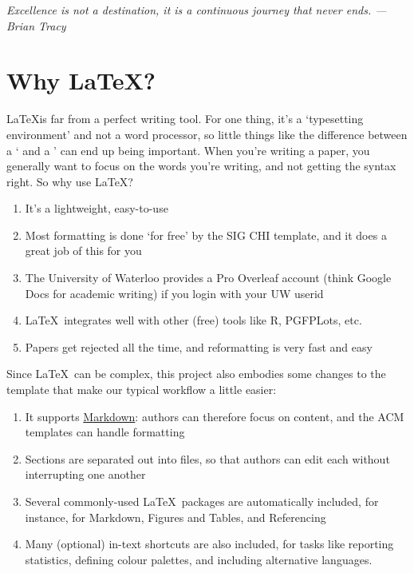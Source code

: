 
\vspace{2em}
\begin{center}
    \emph{Excellence is not a destination, it is a continuous journey that never ends.  --- Brian Tracy}
\end{center}

\section{Why \LaTeX?}

\LaTeX is far from a perfect writing tool. For one thing, it's a `typesetting environment' and not a word processor, so little things like the difference between a ` and a ' can end up being important. When you're writing a paper, you generally want to focus on the words you're writing, and not getting the syntax right. So why use \LaTeX?

\begin{enumerate}
    \item It's a lightweight, easy-to-use
    \item Most formatting is done `for free' by the SIG CHI template, and it does a great job of this for you
    \item The University of Waterloo provides a Pro Overleaf account (think Google Docs for academic writing) if you login with your UW userid
    \item \LaTeX\ integrates well with other (free) tools like R, PGFPLots, etc. 
    \item Papers get rejected all the time, and reformatting is very fast and easy
\end{enumerate}

Since \LaTeX\ can be complex, this project also embodies some changes to the template that make our typical workflow a little easier:

\begin{enumerate}
    \item It supports \href{https://daringfireball.net/projects/markdown/}{Markdown}: authors can therefore focus on content, and the ACM templates can handle formatting
    \item Sections are separated out into files, so that authors can edit each without interrupting one another
    \item Several commonly-used \LaTeX\ packages are automatically included, for instance, for Markdown, Figures and Tables, and Referencing
    \item Many (optional) in-text shortcuts are also included, for tasks like reporting statistics, defining colour palettes, and including alternative languages. 
\end{enumerate}


